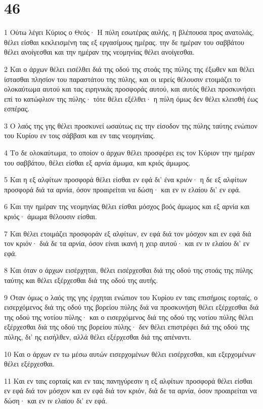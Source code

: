 \chapter{46}

\par 1 Ούτω λέγει Κύριος ο Θεός· Η πύλη εσωτέρας αυλής, η βλέπουσα προς ανατολάς, θέλει είσθαι κεκλεισμένη τας εξ εργασίμους ημέρας. την δε ημέραν του σαββάτου θέλει ανοίγεσθαι και την ημέραν της νεομηνίας θέλει ανοίγεσθαι.
\par 2 Και ο άρχων θέλει εισέλθει διά της οδού της στοάς της πύλης της έξωθεν και θέλει ίστασθαι πλησίον του παραστάτου της πύλης, και οι ιερείς θέλουσιν ετοιμάζει το ολοκαύτωμα αυτού και τας ειρηνικάς προσφοράς αυτού, και αυτός θέλει προσκυνήσει επί το κατώφλιον της πύλης· τότε θέλει εξέλθει· η πύλη όμως δεν θέλει κλεισθή έως εσπέρας.
\par 3 Ο λαός της γης θέλει προσκυνεί ωσαύτως εις την είσοδον της πύλης ταύτης ενώπιον του Κυρίου εν τοις σάββασι και εν ταις νεομηνίαις.
\par 4 Το δε ολοκαύτωμα, το οποίον ο άρχων θέλει προσφέρει εις τον Κύριον την ημέραν του σαββάτου, θέλει είσθαι εξ αρνία άμωμα, και κριός άμωμος.
\par 5 Και η εξ αλφίτων προσφορά θέλει είσθαι εν εφά δι' ένα κριόν· η δε εξ αλφίτων προσφορά διά τα αρνία, όσον προαιρείται να δώση· και εν ιν ελαίου δι' εν εφά.
\par 6 Και την ημέραν της νεομηνίας θέλει είσθαι μόσχος βοός άμωμος και εξ αρνία και κριός· άμωμα θέλουσιν είσθαι.
\par 7 Και θέλει ετοιμάζει προσφοράν εξ αλφίτων, εν εφά διά τον μόσχον και εν εφά διά τον κριόν· διά δε τα αρνία, όσον είναι ικανή η χειρ αυτού· και εν ιν ελαίου δι' εν εφά.
\par 8 Και όταν ο άρχων εισέρχηται, θέλει εισέρχεσθαι διά της οδού της στοάς της πύλης ταύτης και θέλει εξέρχεσθαι διά της οδού της αυτής.
\par 9 Όταν όμως ο λαός της γης έρχηται ενώπιον του Κυρίου εν ταις επισήμοις εορταίς, ο εισερχόμενος διά της οδού της βορείου πύλης διά να προσκυνήση θέλει εξέρχεσθαι διά της οδού της νοτίου πύλης· και ο εισερχόμενος διά της οδού της νοτίου πύλης θέλει εξέρχεσθαι διά της οδού της βορείου πύλης· δεν θέλει επιστρέφει διά της οδού της πύλης, δι' ης εισήλθεν, αλλά θέλει εξέρχεσθαι διά της απέναντι.
\par 10 Και ο άρχων εν τω μέσω αυτών εισερχομένων θέλει εισέρχεσθαι, και εξερχομένων θέλει εξέρχεσθαι.
\par 11 Και εν ταις εορταίς και εν ταις πανηγύρεσιν η εξ αλφίτων προσφορά θέλει είσθαι εν εφά διά τον μόσχον και εν εφά διά τον κριόν, διά δε τα αρνία, όσον προαιρείται να δώση· και εν ιν ελαίου δι' εν εφά.
